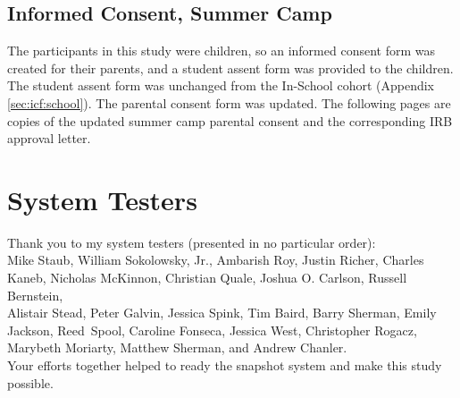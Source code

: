 \section{Informed Consent, Summer Camp}
\label{sec:icf:camp}
The participants in this study were children, so an informed consent form was created for their parents, and a student assent form was provided to the children. The student assent form was unchanged from the In-School cohort (Appendix \ref{sec:icf:school}). The parental consent form was updated. The following pages are copies of the updated summer camp parental consent and the corresponding IRB approval letter.






% 
% 

\chapter{System Testers}
Thank you to my system testers (presented in no particular order): 
\bigskip \\
\noindent 
Mike Staub, William Sokolowsky, Jr., Ambarish Roy, Justin Richer, Charles Kaneb, Nicholas McKinnon, Christian Quale, Joshua O. Carlson, Russell Bernstein, \\ Alistair Stead, Peter Galvin, Jessica Spink, Tim Baird, Barry Sherman, Emily Jackson, Reed~Spool, Caroline Fonseca, Jessica West, Christopher Rogacz, Marybeth Moriarty, Matthew Sherman, and Andrew Chanler.
\bigskip \\
\noindent Your efforts together helped to ready the snapshot system and make this study possible.



